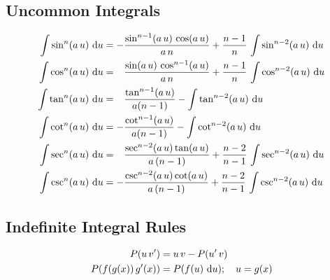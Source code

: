 \documentclass["AM3C-Slides_annotations.tex"]{subfiles}
\begin{document}
\begin{sectionBox}
  \subsection*{Uncommon Integrals}
  \begin{align}
    \int{\sin^n(a\,u)\,\odif{u}}
    &= 
    - \frac
    { \sin^{n-1}(a\,u)\,\cos(a\,u)}
    {a\,n}
    + \frac{n-1}{n}
    \,\int{\sin^{n-2}(a\,u)\,\odif{u}}
    \\
    \int{\cos^n(a\,u)\,\odif{u}}
    &= \phantom{-} 
    \frac
    { \sin(a\,u)\,\cos^{n-1}(a\,u)}
    {a\,n}
    +\frac{n-1}{n}
    \,\int{\cos^{n-2}(a\,u)\,\odif{u}}
    \\
    \int{\tan^n(a\,u)\,\odif{u}}
    &= \phantom{-} 
    \frac
    { \tan^{n-1}(a\,u) }
    {a(n-1)}
    -\int{\tan^{n-2}(a\,u)\,\odif{u}}
    \\
    \int{\cot^n(a\,u)\,\odif{u}}
    &=
    - \frac
    {\cot^{n-1}(a\,u)}
    {a(n-1)}
    -\int{\cot^{n-2}(a\,u)\,\odif{u}}
    \\
    \int{\sec^n(a\,u)\,\odif{u}}
    &= \phantom{-}
    \frac
    {\sec^{n-2}(a\,u) \tan(a\,u)}
    {a\,(n-1)}
    + \frac{n-2}{n-1}
    \,\int{\sec^{n-2}(a\,u)\,\odif{u}}
    \\
    \int{\csc^n(a\,u)\,\odif{u}}
    &=
    - \frac
    {\csc^{n-2}(a\,u) \cot(a\,u)}
    {a\,(n-1)}
    + \frac{n-2}{n-1}
    \,\int{\csc^{n-2}(a\,u)\,\odif{u}}
  \end{align}

  \subsection*{Indefinite Integral Rules}
  \begin{align}
    P(u\,v') &= u\,v - P(u'\,v)
    \\ P(f(g(x))\,g'(x)) &= P(f(u)\,\odif{u});\quad u = g(x)
  \end{align}
  
\end{sectionBox}
\end{document}
